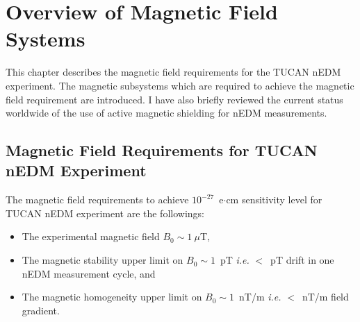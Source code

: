 \chapter{Overview of Magnetic Field Systems}\label{ch:magnetics}



This chapter describes the magnetic field requirements for the TUCAN nEDM experiment. The magnetic subsystems which are required to achieve the magnetic field requirement are introduced. I have also briefly reviewed the current status worldwide of the use of active magnetic shielding for nEDM measurements.


\section{Magnetic Field Requirements for TUCAN nEDM Experiment}\label{sec:msr}

The magnetic field requirements to achieve $10^{-27}$~e$\cdot$cm sensitivity level for TUCAN nEDM experiment are the followings:

\begin{itemize}

    \item The experimental magnetic field $B_0\sim1~\mu$T, 
    \item The magnetic stability upper limit on $B_0\sim1$~pT {\it i.e.} $<$~pT drift in one nEDM measurement cycle, and 
    \item The magnetic homogeneity upper limit on $B_0\sim1$~nT/m {\it i.e.} $<$~nT/m field gradient. 
    
\end{itemize}





